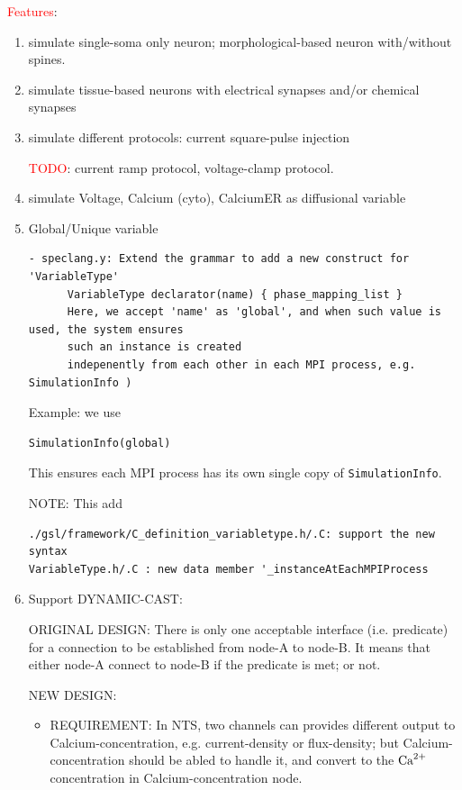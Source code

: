 \textcolor{red}{Features}:
\begin{enumerate}

  \item simulate single-soma only neuron; morphological-based neuron
  with/without spines.
  
  \item simulate tissue-based neurons with electrical synapses and/or chemical
  synapses
  
  \item simulate different protocols: current square-pulse injection 
  
\textcolor{red}{TODO}: current ramp protocol, voltage-clamp protocol. 
  
  \item simulate Voltage, Calcium (cyto), CalciumER as diffusional variable
  
  \item Global/Unique variable
\begin{verbatim}
- speclang.y: Extend the grammar to add a new construct for 'VariableType'
      VariableType declarator(name) { phase_mapping_list }
      Here, we accept 'name' as 'global', and when such value is used, the system ensures
      such an instance is created
      indepenently from each other in each MPI process, e.g. SimulationInfo )

\end{verbatim}
Example: we use

\begin{verbatim}
SimulationInfo(global)
\end{verbatim}
This ensures each MPI process has its own single copy of \verb!SimulationInfo!.

NOTE: This add
\begin{verbatim}
./gsl/framework/C_definition_variabletype.h/.C: support the new syntax
VariableType.h/.C : new data member '_instanceAtEachMPIProcess
\end{verbatim}

  \item Support DYNAMIC-CAST:

ORIGINAL DESIGN: There is only one acceptable interface (i.e. predicate) for a
connection to be established from node-A to node-B. It means that either node-A
connect to node-B if the predicate is met; or not.

NEW DESIGN: 
\begin{itemize}
  \item REQUIREMENT: In NTS, two channels can provides different output to
Calcium-concentration, e.g. current-density or flux-density; but
Calcium-concentration should be abled to handle it, and convert to the
${\text{Ca}^{2+}}$ concentration in Calcium-concentration node.


\end{itemize}
\end{enumerate}
